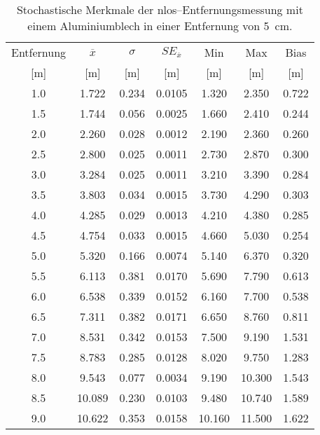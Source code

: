 \begin{appendices}
\begin{table}[h]
	\centering
	\begin{tabular}{||c||ccc||cc||c||}
\hline
Entfernung & $\overline{x}$ & $\sigma$ & $SE_{\overline{x}}$ & Min & Max & Bias \\
{[}\si{\meter}{]} & {[}\si{\meter}{]} & {[}\si{\meter}{]} & {[}\si{\meter}{]} & {[}\si{\meter}{]} & {[}\si{\meter}{]} & {[}\si{\meter}{]} \\
\hline
\hline
\num{1.0} & \num{1.722} & \num{0.234} & \num{0.0105} & \num{1.320} & \num{2.350} & \num{0.722} \\
\num{1.5} & \num{1.744} & \num{0.056} & \num{0.0025} & \num{1.660} & \num{2.410} & \num{0.244} \\
\num{2.0} & \num{2.260} & \num{0.028} & \num{0.0012} & \num{2.190} & \num{2.360} & \num{0.260} \\
\num{2.5} & \num{2.800} & \num{0.025} & \num{0.0011} & \num{2.730} & \num{2.870} & \num{0.300} \\
\num{3.0} & \num{3.284} & \num{0.025} & \num{0.0011} & \num{3.210} & \num{3.390} & \num{0.284} \\
\num{3.5} & \num{3.803} & \num{0.034} & \num{0.0015} & \num{3.730} & \num{4.290} & \num{0.303} \\
\num{4.0} & \num{4.285} & \num{0.029} & \num{0.0013} & \num{4.210} & \num{4.380} & \num{0.285} \\
\num{4.5} & \num{4.754} & \num{0.033} & \num{0.0015} & \num{4.660} & \num{5.030} & \num{0.254} \\
\num{5.0} & \num{5.320} & \num{0.166} & \num{0.0074} & \num{5.140} & \num{6.370} & \num{0.320} \\
\num{5.5} & \num{6.113} & \num{0.381} & \num{0.0170} & \num{5.690} & \num{7.790} & \num{0.613} \\
\num{6.0} & \num{6.538} & \num{0.339} & \num{0.0152} & \num{6.160} & \num{7.700} & \num{0.538} \\
\num{6.5} & \num{7.311} & \num{0.382} & \num{0.0171} & \num{6.650} & \num{8.760} & \num{0.811} \\
\num{7.0} & \num{8.531} & \num{0.342} & \num{0.0153} & \num{7.500} & \num{9.190} & \num{1.531} \\
\num{7.5} & \num{8.783} & \num{0.285} & \num{0.0128} & \num{8.020} & \num{9.750} & \num{1.283} \\
\num{8.0} & \num{9.543} & \num{0.077} & \num{0.0034} & \num{9.190} & \num{10.300} & \num{1.543} \\
\num{8.5} & \num{10.089} & \num{0.230} & \num{0.0103} & \num{9.480} & \num{10.740} & \num{1.589} \\
\num{9.0} & \num{10.622} & \num{0.353} & \num{0.0158} & \num{10.160} & \num{11.500} & \num{1.622} \\
\hline
	\end{tabular}
	\caption{Stochastische Merkmale der \Gls{nlos}--Entfernungsmessung mit einem Aluminiumblech in einer Entfernung von \SI{5}{\centi\meter}.}
	\label{tab:entfernungsmessung_2018_01_20_nlos_metal2}
\end{table}





\end{appendices}
